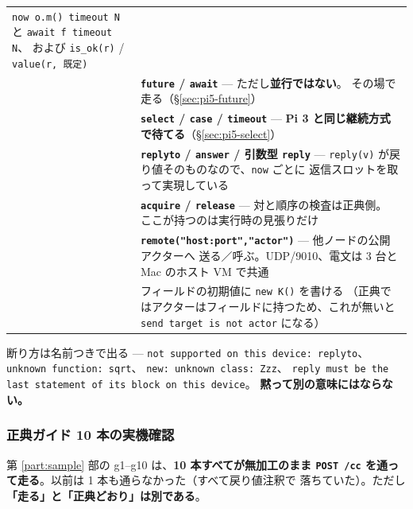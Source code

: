 \documentclass[11pt,a4paper]{ltjsarticle}
\begin{document}
\begin{center}
\begin{tabular}{@{}p{22mm}p{100mm}@{}}
       \texttt{now o.m() timeout N} と \texttt{await f timeout N}、
       および \texttt{is\_ok(r)} / \texttt{value(r, 既定)} \\
     & \textbf{\texttt{future} / \texttt{await}} --- ただし\textbf{並行ではない}。
       その場で走る（\S\ref{sec:pi5-future}） \\
     & \textbf{\texttt{select} / \texttt{case} / \texttt{timeout}} ---
       \textbf{Pi 3 と同じ継続方式で待てる}（\S\ref{sec:pi5-select}） \\
     & \textbf{\texttt{replyto} / \texttt{answer} / 引数型 \texttt{reply}} ---
       \texttt{reply(v)} が戻り値そのものなので、\texttt{now} ごとに
       返信スロットを取って実現している \\
     & \textbf{\texttt{acquire} / \texttt{release}} --- 対と順序の検査は正典側。
       ここが持つのは実行時の見張りだけ \\
     & \textbf{\texttt{remote("host:port","actor")}} --- 他ノードの公開アクターへ
       送る／呼ぶ。UDP/9010、電文は 3 台と Mac のホスト VM で共通 \\
     & フィールドの初期値に \texttt{new K()} を書ける
       （正典ではアクターはフィールドに持つため、これが無いと
       \texttt{send target is not actor} になる） \\

\bottomrule
\end{tabular}
\end{center}

断り方は名前つきで出る ---
\texttt{not supported on this device: replyto}、
\texttt{unknown function: sqrt}、
\texttt{new: unknown class: Zzz}、
\texttt{reply must be the last statement of its block on this device}。
\textbf{黙って別の意味にはならない。}

\subsubsection*{正典ガイド 10 本の実機確認}

第 \ref{part:sample} 部の g1--g10 は、\textbf{10 本すべてが無加工のまま
\texttt{POST /cc} を通って走る}。以前は 1 本も通らなかった（すべて戻り値注釈で
落ちていた）。ただし\textbf{「走る」と「正典どおり」は別である}。
\end{document}
